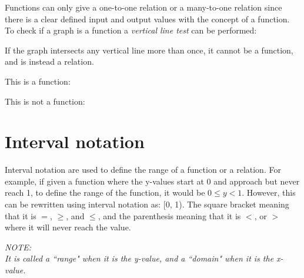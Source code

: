 \documentclass{book}
\newenvironment{note}{\begin{center}\em NOTE:\\}{\end{center}}
\begin{document}
Functions can only give a one-to-one relation or a many-to-one relation since there is a clear defined input and output values with the concept of a function.  To check if a graph is a function a \emph{vertical line test} can be performed:
\begin{center}
	If the graph intersects any vertical line more than once, it cannot be a function, and is instead a relation.
\end{center}
\begin{center}
	This is a function:
	\begin{center}
	\end{center}
\end{center}
\begin{center}
	This is not a function:
	\begin{center}
	\end{center}
\end{center}

\section{Interval notation}
Interval notation are used to define the range of a function or a relation.  For example, if given a function where the y-values start at 0 and approach but never reach 1, to define the range of the function, it would be $0 \leq y < 1$.  However, this can be rewritten using interval notation as: [0, 1).  The square bracket meaning that it is $=$, $\geq$, and $\leq$, and the parenthesis meaning that it is $<$, or $>$ where it will never reach the value.\\
\begin{note}
	It is called a ``range" when it is the y-value, and a ``domain" when it is the x-value.
\end{note}
\end{document}
